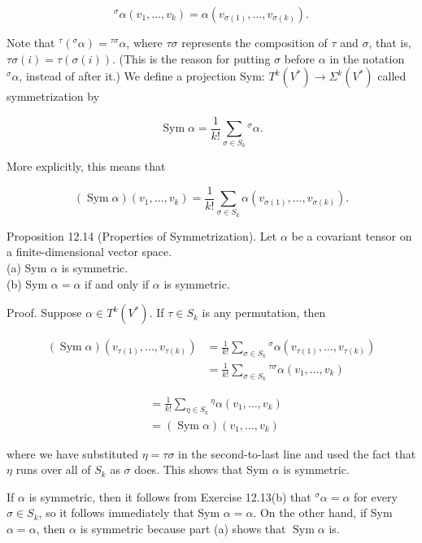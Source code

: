 \documentclass[10pt, letterpaper]{article}
\begin{document}
$$
{ }^{\sigma} \alpha\left(v_{1}, \ldots, v_{k}\right)=\alpha\left(v_{\sigma(1)}, \ldots, v_{\sigma(k)}\right) .
$$

Note that ${ }^{\tau}\left({ }^{\sigma} \alpha\right)={ }^{\tau \sigma} \alpha$, where $\tau \sigma$ represents the composition of $\tau$ and $\sigma$, that is, $\tau \sigma(i)=\tau(\sigma(i))$. (This is the reason for putting $\sigma$ before $\alpha$ in the notation ${ }^{\sigma} \alpha$, instead of after it.) We define a projection Sym: $T^{k}\left(V^{*}\right) \rightarrow \Sigma^{k}\left(V^{*}\right)$ called symmetrization by

$$
\operatorname{Sym} \alpha=\frac{1}{k!} \sum_{\sigma \in S_{k}}{ }^{\sigma} \alpha .
$$

More explicitly, this means that

$$
(\operatorname{Sym} \alpha)\left(v_{1}, \ldots, v_{k}\right)=\frac{1}{k!} \sum_{\sigma \in S_{k}} \alpha\left(v_{\sigma(1)}, \ldots, v_{\sigma(k)}\right) .
$$

Proposition 12.14 (Properties of Symmetrization). Let $\alpha$ be a covariant tensor on a finite-dimensional vector space.\\
(a) Sym $\alpha$ is symmetric.\\
(b) Sym $\alpha=\alpha$ if and only if $\alpha$ is symmetric.

Proof. Suppose $\alpha \in T^{k}\left(V^{*}\right)$. If $\tau \in S_{k}$ is any permutation, then

$$
\begin{aligned}
(\operatorname{Sym} \alpha)\left(v_{\tau(1)}, \ldots, v_{\tau(k)}\right) & =\frac{1}{k!} \sum_{\sigma \in S_{k}}{ }^{\sigma} \alpha\left(v_{\tau(1)}, \ldots, v_{\tau(k)}\right) \\
& =\frac{1}{k!} \sum_{\sigma \in S_{k}}{ }^{\tau \sigma} \alpha\left(v_{1}, \ldots, v_{k}\right)
\end{aligned}
$$

$$
\begin{aligned}
& =\frac{1}{k!} \sum_{\eta \in S_{k}}{ }^{\eta} \alpha\left(v_{1}, \ldots, v_{k}\right) \\
& =(\operatorname{Sym} \alpha)\left(v_{1}, \ldots, v_{k}\right)
\end{aligned}
$$

where we have substituted $\eta=\tau \sigma$ in the second-to-last line and used the fact that $\eta$ runs over all of $S_{k}$ as $\sigma$ does. This shows that Sym $\alpha$ is symmetric.

If $\alpha$ is symmetric, then it follows from Exercise 12.13(b) that ${ }^{\sigma} \alpha=\alpha$ for every $\sigma \in S_{k}$, so it follows immediately that Sym $\alpha=\alpha$. On the other hand, if Sym $\alpha=\alpha$, then $\alpha$ is symmetric because part (a) shows that $\operatorname{Sym} \alpha$ is.
\end{document}
